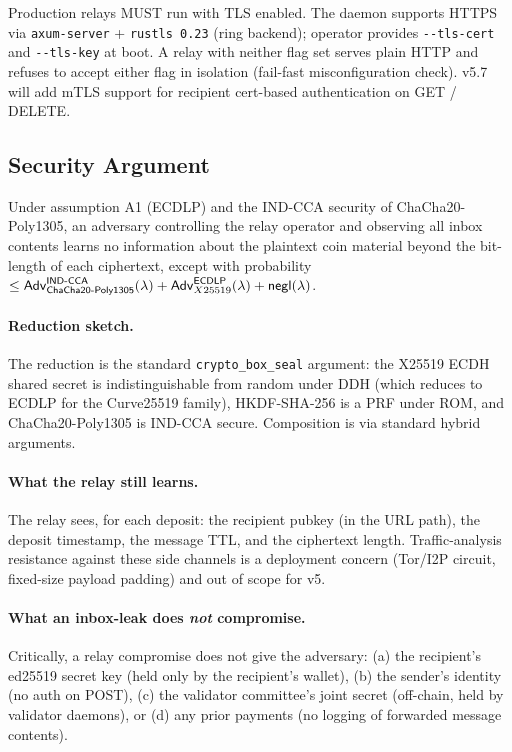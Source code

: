 Production relays MUST run with TLS enabled. The daemon supports HTTPS
via \verb|axum-server| + \verb|rustls 0.23| (ring backend); operator
provides \verb|--tls-cert| and \verb|--tls-key| at boot. A relay with
neither flag set serves plain HTTP and refuses to accept either flag in
isolation (fail-fast misconfiguration check). v5.7 will add mTLS
support for recipient cert-based authentication on GET / DELETE.

\subsection{Security Argument}
\label{sec:relay-security}

\begin{theorem}
\label{thm:relay-confidentiality}
Under assumption A1 (ECDLP) and the IND-CCA security of
ChaCha20-Poly1305, an adversary controlling the relay operator and
observing all inbox contents learns no information about the plaintext
coin material beyond the bit-length of each ciphertext, except with
probability $\leq \mathsf{Adv}^{\mathsf{IND\text{-}CCA}}_{\mathsf{ChaCha20\text{-}Poly1305}}(\lambda)
+ \mathsf{Adv}^{\mathsf{ECDLP}}_{X25519}(\lambda) + \mathsf{negl}(\lambda)$.
\end{theorem}

\paragraph{Reduction sketch.} The reduction is the standard
\verb|crypto_box_seal| argument: the X25519 ECDH shared secret is
indistinguishable from random under DDH (which reduces to ECDLP for
the Curve25519 family), HKDF-SHA-256 is a PRF under ROM, and
ChaCha20-Poly1305 is IND-CCA secure. Composition is via standard
hybrid arguments.

\paragraph{What the relay still learns.} The relay sees, for each
deposit: the recipient pubkey (in the URL path), the deposit timestamp,
the message TTL, and the ciphertext length. Traffic-analysis resistance
against these side channels is a deployment concern (Tor/I2P circuit,
fixed-size payload padding) and out of scope for v5.

\paragraph{What an inbox-leak does \emph{not} compromise.}
Critically, a relay compromise does not give the adversary:
(a) the recipient's ed25519 secret key (held only by the recipient's
wallet), (b) the sender's identity (no auth on POST), (c) the validator
committee's joint secret (off-chain, held by validator daemons), or
(d) any prior payments (no logging of forwarded message contents).

